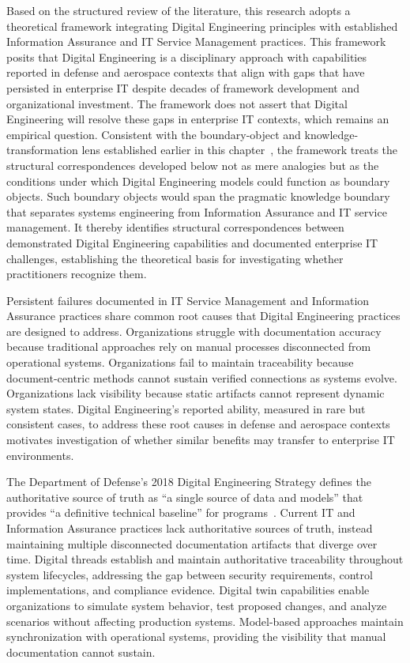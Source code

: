 Based on the structured review of the literature, this research adopts a theoretical framework integrating Digital Engineering principles with established Information Assurance and IT Service Management practices. This framework posits that Digital Engineering is a disciplinary approach with capabilities reported in defense and aerospace contexts that align with gaps that have persisted in enterprise IT despite decades of framework development and organizational investment. The framework does not assert that Digital Engineering will resolve these gaps in enterprise IT contexts, which remains an empirical question. Consistent with the boundary-object and knowledge-transformation lens established earlier in this chapter~\parencite{Star_Griesemer_1989, Carlile_2004}, the framework treats the structural correspondences developed below not as mere analogies but as the conditions under which Digital Engineering models could function as boundary objects. Such boundary objects would span the pragmatic knowledge boundary~\parencite{Carlile_2002, Carlile_2004} that separates systems engineering from Information Assurance and IT service management. It thereby identifies structural correspondences between demonstrated Digital Engineering capabilities and documented enterprise IT challenges, establishing the theoretical basis for investigating whether practitioners recognize them.

Persistent failures documented in IT Service Management and Information Assurance practices share common root causes that Digital Engineering practices are designed to address. Organizations struggle with documentation accuracy because traditional approaches rely on manual processes disconnected from operational systems. Organizations fail to maintain traceability because document-centric methods cannot sustain verified connections as systems evolve. Organizations lack visibility because static artifacts cannot represent dynamic system states. Digital Engineering's reported ability, measured in rare but consistent cases, to address these root causes in defense and aerospace contexts motivates investigation of whether similar benefits may transfer to enterprise IT environments.

The Department of Defense's 2018 Digital Engineering Strategy defines the authoritative source of truth as ``a single source of data and models'' that provides ``a definitive technical baseline'' for programs~\parencite{DoD_DE_Strategy_2018}. Current IT and Information Assurance practices lack authoritative sources of truth, instead maintaining multiple disconnected documentation artifacts that diverge over time. Digital threads establish and maintain authoritative traceability throughout system lifecycles, addressing the gap between security requirements, control implementations, and compliance evidence. Digital twin capabilities enable organizations to simulate system behavior, test proposed changes, and analyze scenarios without affecting production systems. Model-based approaches maintain synchronization with operational systems, providing the visibility that manual documentation cannot sustain.

